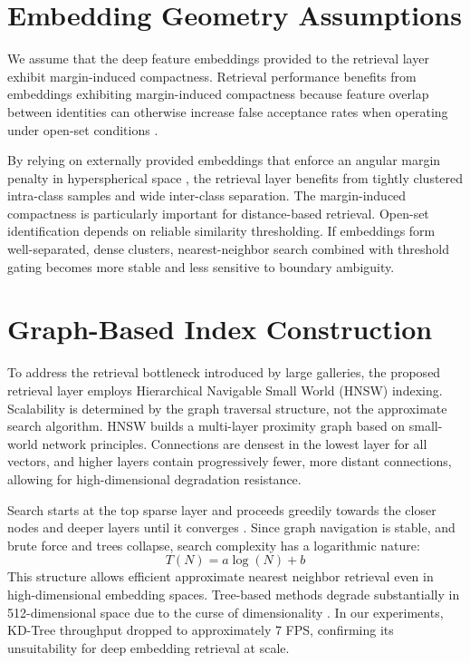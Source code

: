 \documentclass[conference]{IEEEtran}
\begin{document}
\section{Embedding Geometry Assumptions}

We assume that the deep feature embeddings provided to the retrieval layer exhibit margin-induced compactness. Retrieval performance benefits from embeddings exhibiting margin-induced compactness because feature overlap between identities can otherwise increase false acceptance rates when operating under open-set conditions \cite{b11}.

By relying on externally provided embeddings that enforce an angular margin penalty in hyperspherical space \cite{b5}, the retrieval layer benefits from tightly clustered intra-class samples and wide inter-class separation. The margin-induced compactness is particularly important for distance-based retrieval. Open-set identification depends on reliable similarity thresholding. If embeddings form well-separated, dense clusters, nearest-neighbor search combined with threshold gating becomes more stable and less sensitive to boundary ambiguity.

\section{Graph-Based Index Construction}

To address the retrieval bottleneck introduced by large galleries, the proposed retrieval layer employs Hierarchical Navigable Small World (HNSW) indexing. Scalability is determined by the graph traversal structure, not the approximate search algorithm. HNSW builds a multi-layer proximity graph based on small-world network principles. Connections are densest in the lowest layer for all vectors, and higher layers contain progressively fewer, more distant connections, allowing for high-dimensional degradation resistance.

Search starts at the top sparse layer and proceeds greedily towards the closer nodes and deeper layers until it converges \cite{b7}. Since graph navigation is stable, and brute force and trees collapse, search complexity has a logarithmic nature:
\begin{equation}
T(N) = a \log(N) + b
\end{equation}
This structure allows efficient approximate nearest neighbor retrieval even in high-dimensional embedding spaces. Tree-based methods degrade substantially in 512-dimensional space due to the curse of dimensionality \cite{b12}. In our experiments, KD-Tree throughput dropped to approximately 7 FPS, confirming its unsuitability for deep embedding retrieval at scale.
\end{document}
